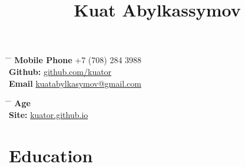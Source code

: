 \documentclass[10pt]{article} %
\begin{document}

\title{Kuat Abylkassymov} %


\parbox{0.5\textwidth}{ %
\begin{tabbing} %
\hspace{3cm} \= \hspace{4cm} \= \kill %
{\bf Mobile Phone} \> +7 (708) 284 3988 \\ %
{\bf Github:} \> \href{https://www.github.com/kuator}{github.com/kuator} \\ %
{\bf Email} \> \href{mailto:kuatabylkasymov@gmail.com}{kuatabylkasymov@gmail.com} \\ %
\end{tabbing}}
\hfill %
\parbox{0.5\textwidth}{ %
\begin{tabbing} %
\hspace{1cm} \= \hspace{1cm} \= \kill %
{\bf Age}  \\ %
{\bf Site:} \> \href{https://kuator.github.io}{kuator.github.io} \\ %
\end{tabbing}}


\section{Education}

\end{document}
